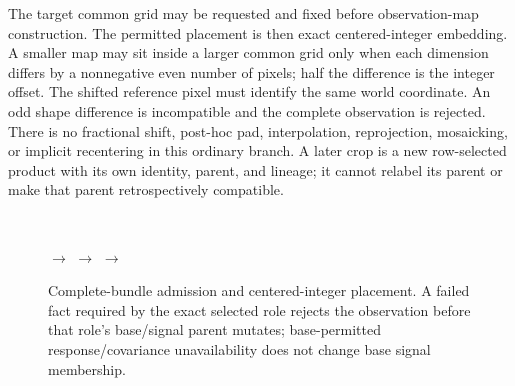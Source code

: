 \documentclass[10pt]{article}
\begin{document}
\SCIMapProductRoleDefinition

\SCIMapProductRoleDependencyTable

The target common grid may be requested and fixed before observation-map
construction. The permitted placement is then exact centered-integer
embedding. A smaller map may
sit inside a larger common grid only when each dimension differs by a
nonnegative even number of pixels; half the difference is the integer offset.
The shifted reference pixel must identify the same world coordinate. An odd
shape difference is incompatible and the complete observation is rejected.
There is no fractional shift, post-hoc pad, interpolation, reprojection,
mosaicking, or implicit recentering in this ordinary branch. A later crop is
a new row-selected product with its own identity, parent, and lineage; it
cannot relabel its parent or make that parent retrospectively compatible.

\begin{figure}[h]
\centering
\begin{minipage}[c]{0.18\linewidth}\centering
{}\\[0.22em]
\end{minipage}
\hfill\(\longrightarrow\)\hfill
{}
\hfill\(\longrightarrow\)\hfill
{}
\hfill\(\longrightarrow\)\hfill
{}
\caption{Complete-bundle admission and centered-integer placement. A failed
fact required by the exact selected role rejects the observation before that
role's base/signal parent mutates; base-permitted response/covariance
unavailability does not change base signal membership.}
\label{fig:coadd}
\end{figure}
\end{document}

